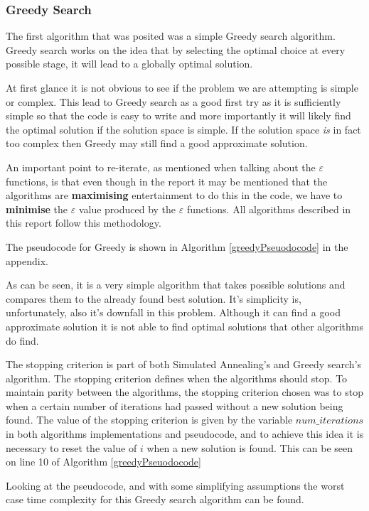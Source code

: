 \documentclass[12pt]{report}
\begin{document}
\subsubsection{Greedy Search}
The first algorithm that was posited was a simple Greedy search algorithm. Greedy search works on the idea that by selecting the optimal choice at every possible stage, it will lead to a globally optimal solution.\cite{GreedySearch}

At first glance it is not obvious to see if the problem we are attempting is simple or complex. This lead to Greedy search as a good first try as it is sufficiently simple so that the code is easy to write and more importantly it will likely find the optimal solution if the solution space is simple. If the solution space \textit{is} in fact too complex then Greedy may still find a good approximate solution.

An important point to re-iterate, as mentioned when talking about the $\varepsilon$ functions, is that even though in the report it may be mentioned that the algorithms are \textbf{maximising} entertainment to do this in the code, we have to \textbf{minimise} the $\varepsilon$ value produced by the $\varepsilon$ functions. All algorithms described in this report follow this methodology.

The pseudocode for Greedy is shown in Algorithm \ref{greedyPseuodocode} in the appendix.

As can be seen, it is a very simple algorithm that takes possible solutions and compares them to the already found best solution. It's simplicity is, unfortunately, also it's downfall in this problem. Although it can find a good approximate solution it is not able to find optimal solutions that other algorithms do find.

The stopping criterion is part of both Simulated Annealing's and Greedy search's algorithm. The stopping criterion defines when the algorithms should stop. To maintain parity between the algorithms, the stopping criterion chosen was to stop when a certain number of iterations had passed without a new solution being found. The value of the stopping criterion is given by the variable $num\_iterations$ in both algorithms implementations and pseudocode, and to achieve this idea it is necessary to reset the value of $i$ when a new solution is found. This can be seen on line 10 of Algorithm \ref{greedyPseuodocode}

Looking at the pseudocode, and with some simplifying assumptions the worst case time complexity for this Greedy search algorithm can be found.
\end{document}
